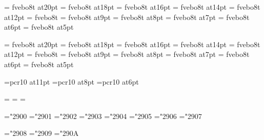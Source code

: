 \font\twentyitbf=      fvebo8t at20pt
\font\eighteenitbf=    fvebo8t at18pt
\font\sixteenitbf=     fvebo8t at16pt
\font\fourteenitbf=    fvebo8t at14pt
\font\twelveitbf=      fvebo8t at12pt
\font\itbf=            fvebo8t
\font\nineitbf=        fvebo8t at9pt
\font\eightitbf=       fvebo8t at8pt
\font\sevenitbf=       fvebo8t at7pt
\font\sixitbf=         fvebo8t at6pt
\font\fiveitbf=        fvebo8t at5pt

\font\twentyslbf=      fvebo8t at20pt
\font\eighteenslbf=    fvebo8t at18pt
\font\sixteenslbf=     fvebo8t at16pt
\font\fourteenslbf=    fvebo8t at14pt
\font\twelveslbf=      fvebo8t at12pt
\font\slbf=            fvebo8t
\font\nineslbf=        fvebo8t at9pt
\font\eightslbf=       fvebo8t at8pt
\font\sevenslbf=       fvebo8t at7pt
\font\sixslbf=         fvebo8t at6pt
\font\fiveslbf=        fvebo8t at5pt



%
%
\font\tenepi=pcr10 at11pt
\font\sevenepi=pcr10 at8pt
\font\fiveepi=pcr10 at6pt

=\tenepi
{}=\sevenepi
{}=\fiveepi
\def\missepi{\fam=9}

\mathchardef\Gamma="2900
\mathchardef\Delta="2901
\mathchardef\Theta="2902
\mathchardef\Lambda="2903
\mathchardef\Xi="2904
\mathchardef\Pi="2905
\mathchardef\Sigma="2906
\mathchardef\Upsilon="2907

\mathchardef\Phi="2908
\mathchardef\Psi="2909
\mathchardef\Omega="290A

%
\rm 